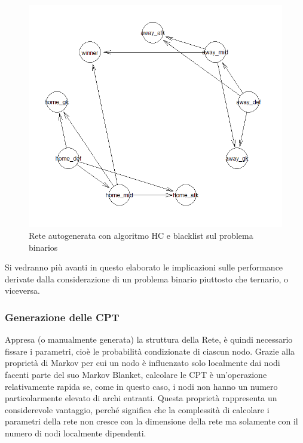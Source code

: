 \documentclass[hidelinks, 12pt]{article}
\begin{document}
\begin{figure}[H]
	\centering
	\includegraphics[scale=0.7]{images/05_02_hc_bin_bl.png}
	\caption[Rete autogenerata con algoritmo HC e blacklist sul problema binario]{Rete autogenerata con algoritmo HC e blacklist sul problema binarios}
	\label{img:hc-bin-bl}
\end{figure}

Si vedranno più avanti in questo elaborato le implicazioni sulle performance derivate dalla considerazione di un problema binario piuttosto che ternario, o viceversa.


\subsubsection{Generazione delle CPT}

Appresa (o manualmente generata) la struttura della Rete, è quindi necessario fissare i parametri, cioè le probabilità condizionate di ciascun nodo. Grazie alla proprietà di Markov per cui un nodo è influenzato solo localmente dai nodi facenti parte del suo Markov Blanket, calcolare le CPT è un'operazione relativamente rapida se, come in questo caso, i nodi non hanno un numero particolarmente elevato di archi entranti. Questa proprietà rappresenta un considerevole vantaggio, perché significa che la complessità di calcolare i parametri della rete non cresce con la dimensione della rete ma solamente con il numero di nodi localmente dipendenti.
\end{document}
